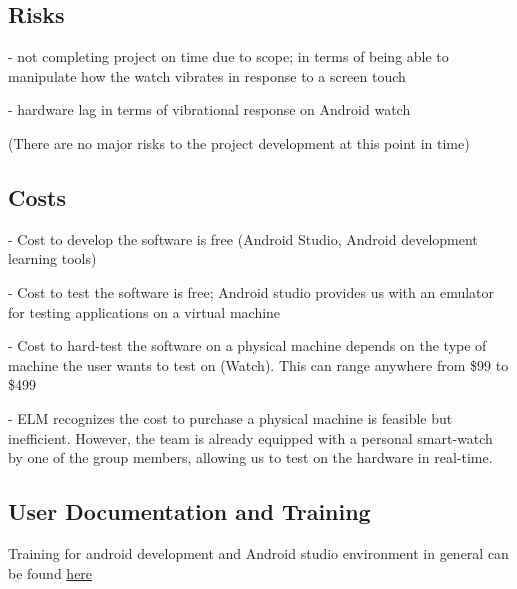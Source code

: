\documentclass[12pt, titlepage]{article}
\begin{document}
\subsection{Risks}

- not completing project on time due to scope; in terms of being able to manipulate how the watch vibrates in response to a screen touch

\noindent - hardware lag in terms of vibrational response on Android watch

\noindent (There are no major risks to the project development at this point in time)

\subsection{Costs}

- Cost to develop the software is free (Android Studio, Android development learning tools)

\noindent - Cost to test the software is free; Android studio provides us with an emulator for testing applications on a virtual machine

\noindent - Cost to hard-test the software on a physical machine depends on the type of machine the user wants to test on (Watch). This can range anywhere from \$99 to \$499

\noindent - ELM recognizes the cost to purchase a physical machine is feasible but inefficient. However, the team is already equipped with a personal smart-watch by one of the group members, allowing us to test on the hardware in real-time.

\subsection{User Documentation and Training}

Training for android development and Android studio environment in general can be found \href{https://developer.android.com/index.html}{here}




\end{document}
